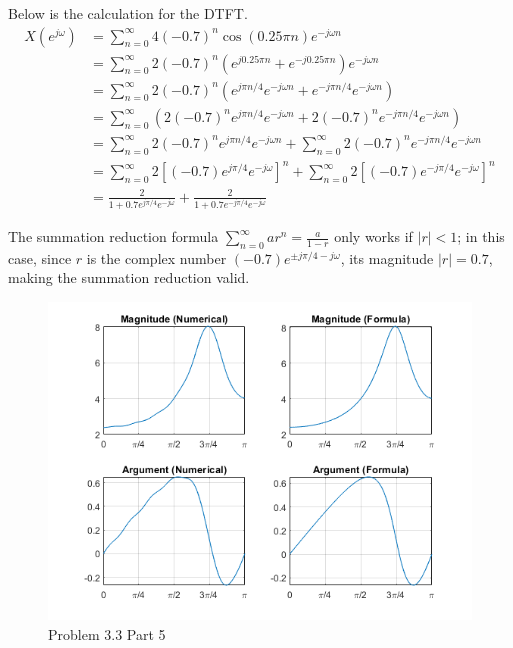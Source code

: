 \documentclass{article}
\begin{document}
Below is the calculation for the DTFT.
\begin{align*}
    X\left(e^{j\omega}\right) &= \sum_{n=0}^\infty 4(-0.7)^n\cos(0.25\pi n)e^{-j\omega n}\\
    &=\sum_{n=0}^\infty 2(-0.7)^n \left(e^{j0.25\pi n} + e^{-j0.25\pi n}\right)e^{-j\omega n}\\
    &=\sum_{n=0}^\infty 2(-0.7)^n
    \left(
        e^{j\pi n/4} e^{- j\omega n} + e^{-j\pi n/4} e^{- j\omega n}
    \right)\\
    &=\sum_{n=0}^\infty \left( 2
        (-0.7)^n e^{j\pi n/4} e^{- j\omega n} +2 (-0.7)^n e^{-j\pi n/4} e^{- j\omega n}
    \right)\\
    &= \sum_{n=0}^\infty 2
    (-0.7)^n e^{j\pi n/4} e^{- j\omega n} +
    \sum_{n=0}^\infty 2 (-0.7)^n e^{-j\pi n/4} e^{- j\omega n}\\
    &= \sum_{n=0}^\infty 2
    \left[(-0.7) e^{j\pi/4} e^{- j\omega}\right]^n +
    \sum_{n=0}^\infty 2 \left[(-0.7) e^{-j\pi/4} e^{- j\omega}\right]^n\\
    &= \frac{2}{1 + 0.7 e^{j\pi/4} e^{- j\omega}}
    + \frac{2}{1 + 0.7 e^{-j\pi/4} e^{- j\omega}}
\end{align*}

The summation reduction formula \(\sum_{n=0}^\infty ar^n = \frac{a}{1-r}\) only works if \(|r| < 1\); in this case, since \(r\) is the complex number \((-0.7)e^{\pm j\pi/4 - j\omega}\), its magnitude \(|r| = 0.7\), making the summation reduction valid.

\begin{figure}[H]
    \centering
    \includegraphics[width=\textwidth]{html/Homework3_04.png}
    \caption{Problem 3.3 Part 5}
    \label{3.3.5}
\end{figure}
\end{document}
